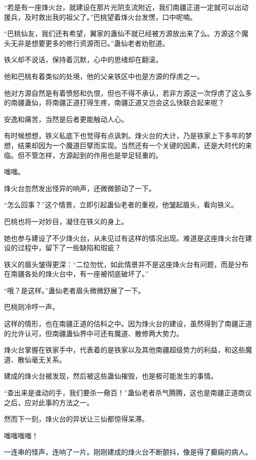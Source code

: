 \begin{this_body}
“若是有一座烽火台，就建设在那片光阴支流附近，我们南疆正道一定就可以出动援兵，及时救出我的祖父了。”巴桃望着烽火台发愣，口中呢喃。

“巴桃仙友，我们还有希望，翼家的蛊仙不就已经被方源放出来了么。方源这个魔头无非是想要更多的修行资源而已。”蛊仙老者劝慰道。

铁义却不说话，保持着沉默，心中的思绪却在翻滚。

他和巴桃有着类似的处境，他的父亲铁区中也是方源的俘虏之一。

他对方源自然是有着愤怒和仇恨，但也不得不承认，若非方源这一次俘虏了这么多的南疆蛊仙，将南疆正道打得生疼，南疆正道又岂会这么快联合起来呢？

安逸和痛苦，当然是后者更能触动人心。

有时候想想，铁义私底下也觉得有点讽刺。烽火台的大计，乃是铁家上下多年的梦想，结果却因为一个魔道巨擘而实现。当然还有一个关键的因素，还是大时代的来临。但不管怎样，方源起到的作用也是举足轻重的。

嗤嗤。

烽火台忽然发出怪异的响声，还微微颤动了一下。

“怎么回事？”这个情景，立即引起蛊仙老者的重视，他皱起眉头，看向铁义。

巴桃也将一对妙目，凝住在铁义的身上。

她也参与建设了不少烽火台，从未见过有这样的情况出现。难道是这座烽火台在建设的过程中，留下了一些缺陷和瑕疵？

铁义的眉头皱得更深：“二位勿忧，如此情景并不是这座烽火台有问题，而是分布在南疆各处的烽火台中，有一座被彻底破坏了。”

“哦？是这样。”蛊仙老者眉头微微舒展了一下。

巴桃则冷哼一声。

这样的情形，也在南疆正道的估料之中。因为烽火台的建设，虽然得到了南疆正道的允许认可，但南疆蛊仙界中可还有魔道、散修两大势力。

烽火台掌握在铁家手中，代表着的是铁家以及其他南疆超级势力的利益，和这些魔道、散仙毫无关系。

建成的烽火台被发现，然后被这些蛊仙摧毁，也是极可能发生的事情。

“查出来是谁动的手，我们要杀一儆百！”蛊仙老者杀气腾腾，这也是南疆正道商议之后，应对此事的方法之一。

然而下一刻，烽火台的异状让三仙都惊得呆滞。

嗤嗤嗤嗤！

一连串的怪声，连响了一片。刚刚建成的烽火台不断颤抖，像是得了癫痫的病人。


\end{this_body}
